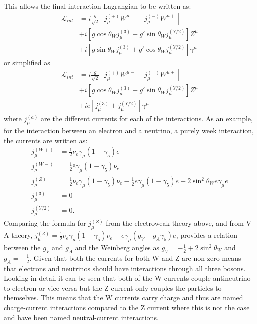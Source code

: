 This allows the final interaction Lagrangian to be written as:
\begin{align}
\mathcal{L}_{int}&=i\frac{g}{\sqrt{2}}[j_\mu^{(+)}W^{\mu-}+j_\mu^{(-)}W^{\mu+}]\\ \nonumber
&+i[g\cos\theta_Wj_\mu^{(3)}-g'\sin\theta_Wj_\mu^{(Y/2)}]Z^\mu\\ \nonumber
&+i[g\sin\theta_Wj_\mu^{(3)}+g'\cos\theta_Wj_\mu^{(Y/2)}]\gamma^\mu
\end{align}
or simplified as 
\begin{align}
\mathcal{L}_{int}&=i\frac{g}{\sqrt{2}}[j_\mu^{(+)}W^{\mu-}+j_\mu^{(-)}W^{\mu+}]\\ \nonumber
&+i[g\cos\theta_Wj_\mu^{(3)}-g'\sin\theta_Wj_\mu^{(Y/2)}]Z^\mu\\ \nonumber
&+ie[j_\mu^{(3)}+j_\mu^{(Y/2)}]\gamma^\mu
\end{align}
where $j_{\mu}^{(a)}$ are the different currents for each of the interactions. As an example, for the interaction between an electron and a neutrino, a purely week interaction, the currents are written as:
\begin{align}
j_\mu^{(W+)}&=\frac{1}{2}\bar{\nu}_e\gamma_\mu(1-\gamma_5)e\\
j_\mu^{(W-)}&=\frac{1}{2}\bar{e}\gamma_\mu(1-\gamma_5)\nu_e\\
j_\mu^{(Z)}&=\frac{1}{2}\bar{\nu}_e\gamma_\mu(1-\gamma_5)\nu_e-\frac{1}{2}\bar{e}\gamma_\mu(1-\gamma_5)e+2\sin^2\theta_W\bar{e}\gamma_\mu e\\
j_\mu^{(3)}&=0\\
j_\mu^{(Y/2)}&=0.
\end{align}
Comparing the formula for $j_\mu^{(Z)}$ from the electroweak theory above, and from V-A theory, $j_\mu^{(Z)}=\frac{1}{2}\bar{\nu}_e\gamma_\mu(1-\gamma_5)\nu_e+\bar{e}\gamma_\mu(g_V-g_A\gamma_5)e$, provides a relation between the $g_V$ and $g_A$ and the Weinberg angles as $g_V=-\frac{1}{2}+2\sin^2\theta_W$ and $g_A = -\frac{1}{2}$. Given that both the currents for both W and Z are non-zero means that electrons and neutrinos should have interactions through all three bosons. Looking in detail it can be seen that both of the W currents couple antineutrino to electron or vice-versa but the Z current only couples the particles to themselves. This means that the W currents carry charge and thus are named charge-current interactions compared to the Z current where this is not the case and have been named neutral-current interactions.


